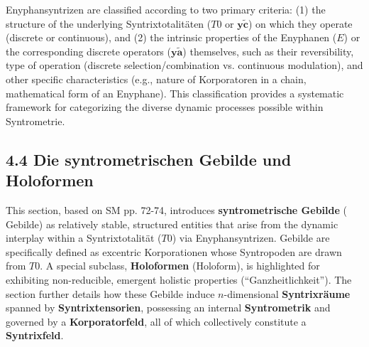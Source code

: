 \documentclass[12pt]{article}
\newcommand{\q}[1]{\enquote{#1}}
\newcommand{\syntrixtotalitaet}{T0}
\newcommand{\diskreteEnyphansyntrix}{\bm{y\widetilde{a}}}
\newcommand{\enyphane}{E}
\newcommand{\syntrometrischesGebilde}{\text{Gebilde}}
\newcommand{\holoform}{\text{Holoform}}
\begin{document}
Enyphansyntrizen are classified according to two primary criteria: (1) the structure of the underlying Syntrixtotalitäten (\(\syntrixtotalitaet\) or \(\mathbf{y\widetilde{c}}\)) on which they operate (discrete or continuous), and (2) the intrinsic properties of the Enyphanen (\(\enyphane\)) or the corresponding discrete operators (\(\diskreteEnyphansyntrix\)) themselves, such as their reversibility, type of operation (discrete selection/combination vs. continuous modulation), and other specific characteristics (e.g., nature of Korporatoren in a chain, mathematical form of an Enyphane). This classification provides a systematic framework for categorizing the diverse dynamic processes possible within Syntrometrie.

\subsection{4.4 Die syntrometrischen Gebilde und Holoformen}
\label{sec:gebilde}

This section, based on SM pp. 72-74, introduces \textbf{syntrometrische Gebilde} (\(\syntrometrischesGebilde\)) as relatively stable, structured entities that arise from the dynamic interplay within a Syntrixtotalität (\(\syntrixtotalitaet\)) via Enyphansyntrizen. Gebilde are specifically defined as excentric Korporationen whose Syntropoden are drawn from \( \syntrixtotalitaet \). A special subclass, \textbf{Holoformen} (\(\holoform\)), is highlighted for exhibiting non-reducible, emergent holistic properties (\q{Ganzheitlichkeit}). The section further details how these Gebilde induce \(n\)-dimensional \textbf{Syntrixräume} spanned by \textbf{Syntrixtensorien}, possessing an internal \textbf{Syntrometrik} and governed by a \textbf{Korporatorfeld}, all of which collectively constitute a \textbf{Syntrixfeld}.
\end{document}

